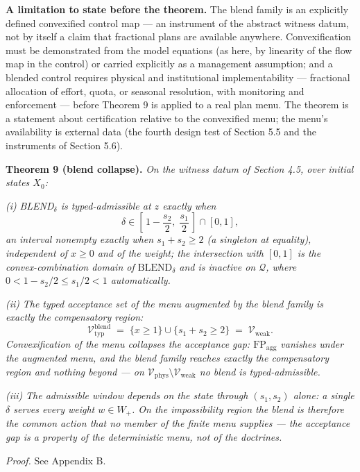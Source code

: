 \documentclass[3p,11pt]{elsarticle}
\begin{document}
\noindent\textbf{A limitation to state before the theorem.} The blend
family is an explicitly defined convexified control map --- an instrument
of the abstract witness datum, not by itself a claim that fractional plans
are available anywhere. Convexification must be demonstrated from the
model equations (as here, by linearity of the flow map in the control) or
carried explicitly as a management assumption; and a blended control
requires physical and institutional implementability --- fractional
allocation of effort, quota, or seasonal resolution, with monitoring and
enforcement --- before Theorem 9 is applied to a real plan menu. The
theorem is a statement about certification relative to the convexified
menu; the menu's availability is external data (the fourth design test of
Section 5.5 and the instruments of Section 5.6).

\textbf{Theorem 9 (blend collapse).} \emph{On the witness datum of
Section 4.5, over initial states \(X_0\):}

\emph{(i)} \emph{BLEND\(_\delta\) is typed-admissible at \(z\) exactly
when}
\[\delta \in \left[\,1 - \frac{s_2}{2},\; \frac{s_1}{2}\,\right] \cap [0,1],\]
\emph{an interval nonempty exactly when \(s_1 + s_2 \ge 2\) (a singleton
at equality), independent of \(x \ge 0\) and of the weight; the
intersection with \([0,1]\) is the convex-combination domain of
\(\mathrm{BLEND}_\delta\) and is inactive on \(\mathcal{Q}\), where
\(0 < 1 - s_2/2 \le s_1/2 < 1\) automatically.}

\emph{(ii)} \emph{The typed acceptance set of the menu augmented by the
blend family is exactly the compensatory region:}
\[\mathcal{V}_{\mathrm{typ}}^{\mathrm{blend}} \;=\; \{ x \ge 1 \} \cup \{ s_1 + s_2 \ge 2 \} \;=\; \mathcal{V}_{\mathrm{weak}}.\]
\emph{Convexification of the menu collapses the acceptance gap:
\(\mathrm{FP}_{\mathrm{agg}}\) vanishes under the augmented menu, and
the blend family reaches exactly the compensatory region and nothing
beyond --- on
\(\mathcal{V}_{\mathrm{phys}} \setminus \mathcal{V}_{\mathrm{weak}}\) no
blend is typed-admissible.}

\emph{(iii)} \emph{The admissible window depends on the state through
\((s_1, s_2)\) alone: a single \(\delta\) serves every weight
\(w \in W_+\). On the impossibility region the blend is therefore the
common action that no member of the finite menu supplies --- the
acceptance gap is a property of the deterministic menu, not of the
doctrines.}

\emph{Proof.} See Appendix B.
\end{document}
